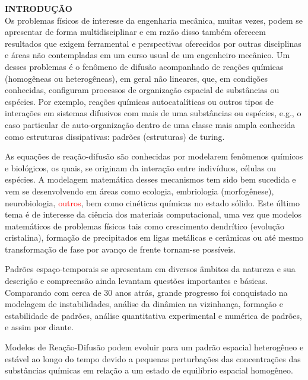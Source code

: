 \noindent\textbf{INTRODUÇÃO}
$\!$\\
\indent Os problemas físicos de interesse da engenharia mecânica, muitas vezes, podem se apresentar de forma multidisciplinar e em razão disso também oferecem resultados que exigem ferramental e perspectivas oferecidos por outras disciplinas e áreas não contempladas em um curso usual de um engenheiro mecânico. Um desses problemas é o fenômeno de difusão acompanhado de reações químicas (homogêneas ou heterogêneas), em geral não lineares, que, em condições conhecidas, configuram processos de organização espacial de substâncias ou espécies. Por exemplo, reações químicas autocatalíticas ou outros tipos de interações em sistemas difusivos com mais de uma substâncias ou espécies, e.g., o caso particular de auto-organização dentro de uma classe mais ampla conhecida como estruturas dissipativas: padrões (estruturas) de turing.\par
\begin{figure}[H]
\centering
\end{figure}
As equações de reação-difusão são conhecidas por modelarem fenômenos químicos e biológicos, os quais, se originam da interação entre indivíduos, células ou espécies. A modelagem matemática desses mecanismos tem sido bem sucedida e vem se desenvolvendo em áreas como ecologia, embriologia (morfogênese), neurobiologia, \textcolor{red}{outros}, bem como cinéticas químicas no estado sólido. Este último tema é de interesse da ciência dos materiais computacional, uma vez que modelos matemáticos de problemas físicos tais como crescimento dendrítico (evolução cristalina), formação de precipitados em ligas metálicas e cerâmicas ou até mesmo transformação de fase por avanço de frente tornam-se possíveis.\par
Padrões espaço-temporais se apresentam em diversos âmbitos da natureza e sua descrição e compreensão ainda levantam questões importantes e básicas. Comparando com cerca de 30 anos atrás, grande progresso foi conquistado na modelagem de instabilidades, análise da dinâmica na vizinhança, formação e estabilidade de padrões, análise quantitativa experimental e numérica de padrões, e assim por diante. \par
Modelos de Reação-Difusão podem evoluir para um padrão
espacial heterogêneo e estável ao longo do tempo devido a pequenas perturbações das
concentrações das substâncias químicas em relação a um estado de equilíbrio espacial
homogêneo.\par

